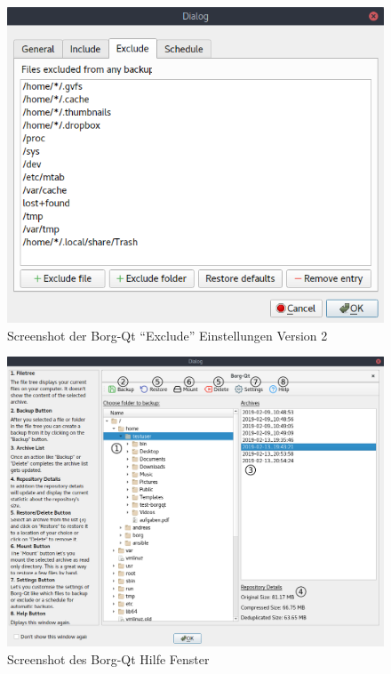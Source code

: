 \begin{figure}[H]
\centering
\includegraphics[height=.40\textheight]{pictures/borgqt_settings_exclude_v2.png}
\caption{\label{fig:org562e65a}
Screenshot der Borg-Qt "`Exclude"' Einstellungen Version 2}
\end{figure}

\begin{landscape}
\begin{figure}
\centering
\includegraphics[width=17cm]{pictures/borgqt_help.png}
\caption{\label{fig:orgf44d24c}
Screenshot des Borg-Qt Hilfe Fenster}
\end{figure}
\end{landscape}


